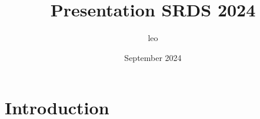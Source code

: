 \documentclass{article}
\title{Presentation SRDS 2024}
\author{leo }
\date{September 2024}
\begin{document}
\maketitle

\section{Introduction}
\end{document}
